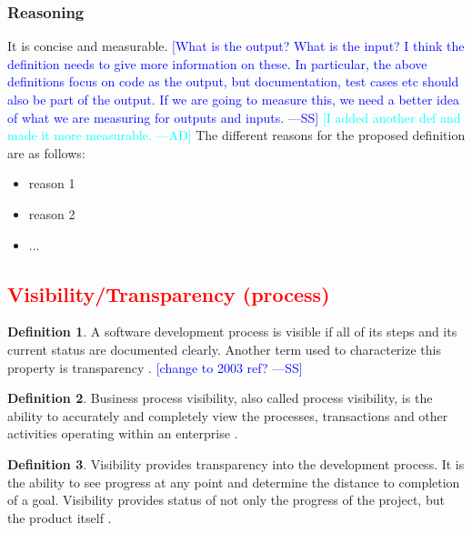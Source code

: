\documentclass[letterpaper, cleveref]{lipics-v2019}
\newcommand{\authornote}[3]{\textcolor{#1}{[#3 ---#2]}}
\newcommand{\authornote}[3]{}
\newcommand{\wss}[1]{\authornote{blue}{SS}{#1}} %
\newcommand{\ad}[1]{\authornote{cyan}{AD}{#1}} %
\newcommand{\notdone}[1]{\textcolor{red}{#1}}
\theoremstyle{definition}
\newtheorem{defn}{Definition}
\begin{document}
\subsubsection*{Reasoning}

It is concise and measurable. \wss{What is the output?  What is the input? I
think the definition needs to give more information on these.  In particular,
the above definitions focus on code as the output, but documentation, test cases
etc should also be part of the output.  If we are going to measure this, we need
a better idea of what we are measuring for outputs and inputs.} \ad{I added
another def and made it more measurable.}   The different reasons for the
proposed definition are as follows:

\begin{itemize}
  \item reason 1
  \item reason 2
  \item ...
\end{itemize}


\subsection{\notdone{Visibility/Transparency (process)}} %

\begin{defn}
  \label{VisibilitySelected} A software development process is visible if
  all of its steps and its current status are documented clearly. Another
  term used to characterize this property is transparency
  \citep{ghezzi1991fundamentals}. \wss{change to 2003 ref?}
\end{defn}

\begin{defn}
  Business process visibility, also called process visibility, is the ability to
  accurately and completely view the processes, transactions and other
  activities operating within an enterprise \citep{Rouse2013}.
\end{defn}

\begin{defn}
  Visibility provides transparency into the development process. It is the
  ability to see progress at any point and determine the distance to completion
  of a goal.  Visibility provides status of not only the progress of the
  project, but the product itself \citep{GSA2019}.
\end{defn}
\end{document}
